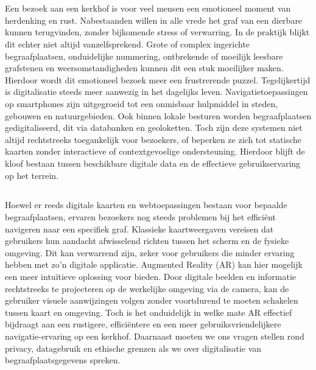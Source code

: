 
\chapter{}%
\label{ch:inleiding}

Een bezoek aan een kerkhof is voor veel mensen een emotioneel moment van herdenking en rust. Nabestaanden willen in alle vrede het graf van een dierbare kunnen terugvinden, zonder bijkomende stress of verwarring. In de praktijk blijkt dit echter niet altijd vanzelfsprekend. Grote of complex ingerichte begraafplaatsen, onduidelijke nummering, ontbrekende of moeilijk leesbare grafstenen en weersomstandigheden kunnen dit een stuk moeilijker maken. Hierdoor wordt dit emotioneel bezoek meer een frustrerende puzzel. Tegelijkertijd is digitalisatie steeds meer aanwezig in het dagelijks leven. Navigatietoepassingen op smartphones zijn uitgegroeid tot een onmisbaar hulpmiddel in steden, gebouwen en natuurgebieden. Ook binnen lokale besturen worden begraafplaatsen gedigitaliseerd, dit via databanken en geoloketten. Toch zijn deze systemen niet altijd rechtstreeks toegankelijk voor bezoekers, of beperken ze zich tot statische kaarten zonder interactieve of contextgevoelige ondersteuning. Hierdoor blijft de kloof bestaan tussen beschikbare digitale data en de effectieve gebruikservaring op het terrein.

\section{}%
\label{sec:probleemstelling}

Hoewel er reeds digitale kaarten en webtoepassingen bestaan voor bepaalde begraafplaatsen, ervaren bezoekers nog steeds problemen bij het efficiënt navigeren naar een specifiek graf. Klassieke kaartweergaven vereisen dat gebruikers hun aandacht afwisselend richten tussen het scherm en de fysieke omgeving. Dit kan verwarrend zijn, zeker voor gebruikers die minder ervaring hebben met zo’n digitale applicatie. Augmented Reality (AR) kan hier mogelijk een meer intuïtieve oplossing voor bieden. Door digitale beelden en informatie rechtstreeks te projecteren op de werkelijke omgeving via de camera, kan de gebruiker visuele aanwijzingen volgen zonder voortdurend te moeten schakelen tussen kaart en omgeving. Toch is het onduidelijk in welke mate AR effectief bijdraagt aan een rustigere, efficiëntere en een meer gebruiksvriendelijkere navigatie-ervaring op een kerkhof. Daarnaast moeten we ons vragen stellen rond privacy, datagebruik en ethische grenzen als we over digitalisatie van begraafplaatsgegevens spreken.

